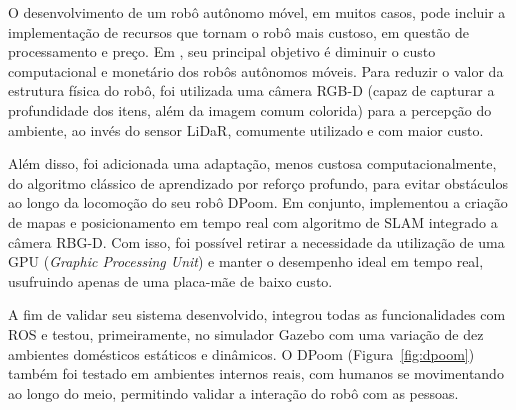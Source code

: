 O desenvolvimento de um robô autônomo móvel, em muitos casos, pode incluir a implementação de recursos que tornam o robô mais custoso, em questão de processamento e preço. Em \citet{dpoom}, seu principal objetivo é diminuir o custo computacional e monetário dos robôs autônomos móveis. Para reduzir o valor da estrutura física do robô, foi utilizada uma câmera RGB-D (capaz de capturar a profundidade dos itens, além da imagem comum colorida) para a percepção do ambiente, ao invés do sensor LiDaR, comumente utilizado e com maior custo. 

Além disso, foi adicionada uma adaptação, menos custosa computacionalmente, do algoritmo clássico de aprendizado por reforço profundo, para evitar obstáculos ao longo da locomoção do seu robô DPoom. Em conjunto, \citet{dpoom} implementou a criação de mapas e posicionamento em tempo real com algoritmo de SLAM integrado a câmera RBG-D. Com isso, foi possível retirar a necessidade da utilização de uma GPU (\textit{Graphic Processing Unit}) e manter o desempenho ideal em tempo real, usufruindo apenas de uma placa-mãe de baixo custo.

A fim de validar seu sistema desenvolvido, \citet{dpoom} integrou todas as funcionalidades com ROS e testou, primeiramente, no simulador Gazebo com uma variação de dez ambientes domésticos estáticos e dinâmicos. O  DPoom (Figura~\ref{fig:dpoom}) também foi testado em ambientes internos reais, com humanos se movimentando ao longo do meio, permitindo validar a interação do robô com as pessoas.

